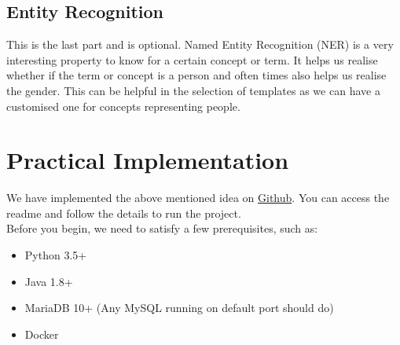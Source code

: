 \documentclass[conference]{IEEEtran}
\begin{document}
\subsection{Entity Recognition}
This is the last part and is optional. Named Entity Recognition (NER) is a very interesting property to know for a certain concept or term. It helps us realise whether if the term or concept is a person and often times also helps us realise the gender. This can be helpful in the selection of templates as we can have a customised one for concepts representing people.

\section{Practical Implementation}
We have implemented the above mentioned idea on \href{https://github.com/vivekpatani/text-summarizer}{Github}. You can access the readme and follow the details to run the project.\\
Before you begin, we need to satisfy a few prerequisites, such as:
\begin{itemize}
\item Python 3.5+
\item Java 1.8+
\item MariaDB 10+ (Any MySQL running on default port should do)
\item Docker
\end{itemize}
\end{document}
